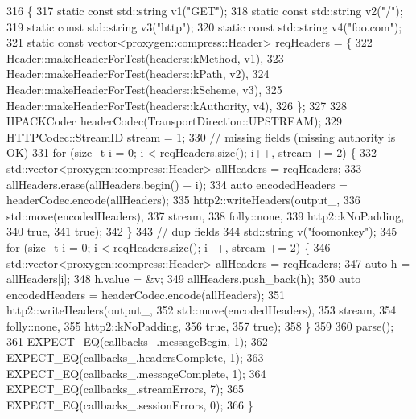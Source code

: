 \begin{DoxyCode}
316                                    \{
317   \textcolor{keyword}{static} \textcolor{keyword}{const} std::string v1(\textcolor{stringliteral}{"GET"});
318   \textcolor{keyword}{static} \textcolor{keyword}{const} std::string v2(\textcolor{stringliteral}{"/"});
319   \textcolor{keyword}{static} \textcolor{keyword}{const} std::string v3(\textcolor{stringliteral}{"http"});
320   \textcolor{keyword}{static} \textcolor{keyword}{const} std::string v4(\textcolor{stringliteral}{"foo.com"});
321   \textcolor{keyword}{static} \textcolor{keyword}{const} vector<proxygen::compress::Header> reqHeaders = \{
322     Header::makeHeaderForTest(headers::kMethod, v1),
323     Header::makeHeaderForTest(headers::kPath, v2),
324     Header::makeHeaderForTest(headers::kScheme, v3),
325     Header::makeHeaderForTest(headers::kAuthority, v4),
326   \};
327 
328   HPACKCodec headerCodec(TransportDirection::UPSTREAM);
329   HTTPCodec::StreamID stream = 1;
330   \textcolor{comment}{// missing fields (missing authority is OK)}
331   \textcolor{keywordflow}{for} (\textcolor{keywordtype}{size\_t} i = 0; i < reqHeaders.size(); i++, stream += 2) \{
332     std::vector<proxygen::compress::Header> allHeaders = reqHeaders;
333     allHeaders.erase(allHeaders.begin() + i);
334     \textcolor{keyword}{auto} encodedHeaders = headerCodec.encode(allHeaders);
335     http2::writeHeaders(output\_,
336                         std::move(encodedHeaders),
337                         stream,
338                         folly::none,
339                         http2::kNoPadding,
340                         \textcolor{keyword}{true},
341                         \textcolor{keyword}{true});
342   \}
343   \textcolor{comment}{// dup fields}
344   std::string v(\textcolor{stringliteral}{"foomonkey"});
345   \textcolor{keywordflow}{for} (\textcolor{keywordtype}{size\_t} i = 0; i < reqHeaders.size(); i++, stream += 2) \{
346     std::vector<proxygen::compress::Header> allHeaders = reqHeaders;
347     \textcolor{keyword}{auto} h = allHeaders[i];
348     h.value = &v;
349     allHeaders.push\_back(h);
350     \textcolor{keyword}{auto} encodedHeaders = headerCodec.encode(allHeaders);
351     http2::writeHeaders(output\_,
352                         std::move(encodedHeaders),
353                         stream,
354                         folly::none,
355                         http2::kNoPadding,
356                         \textcolor{keyword}{true},
357                         \textcolor{keyword}{true});
358   \}
359 
360   parse();
361   EXPECT\_EQ(callbacks\_.messageBegin, 1);
362   EXPECT\_EQ(callbacks\_.headersComplete, 1);
363   EXPECT\_EQ(callbacks\_.messageComplete, 1);
364   EXPECT\_EQ(callbacks\_.streamErrors, 7);
365   EXPECT\_EQ(callbacks\_.sessionErrors, 0);
366 \}
\end{DoxyCode}
